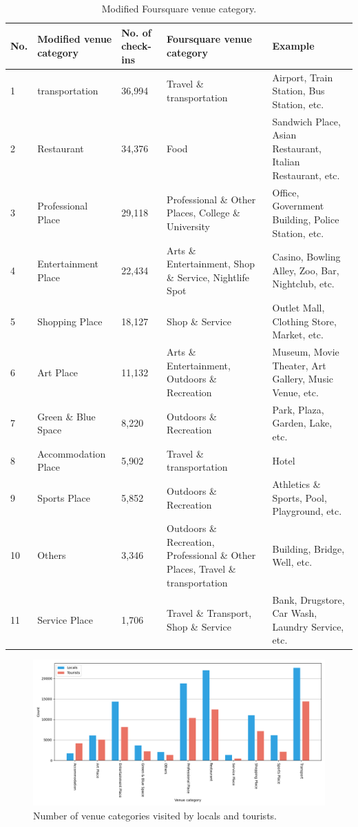 \documentclass{article}
\theoremstyle{definition}
\theoremstyle{remark}
\begin{document}
\begin{table}[h!]
\centering
\caption{\label{tab:modified_category}Modified Foursquare venue category.}
\begin{adjustbox}{max width=\textwidth, margin=0cm}
\begin{tabular}{lllp{6cm}p{5cm}} \hline
No. & Modified venue category & No. of check-ins & Foursquare venue category 
& Example \\ \hline
1 & transportation & 36,994 & Travel \& transportation & Airport, Train Station, Bus Station, etc. \\
2 & Restaurant & 34,376 & Food & Sandwich Place, Asian Restaurant, Italian Restaurant, etc. \\
3 & Professional Place & 29,118 & Professional \& Other Places, College \& University & Office, Government Building, Police Station, etc. \\
4 & Entertainment Place & 22,434 & Arts \& Entertainment, Shop \& Service, Nightlife Spot & Casino, Bowling Alley, Zoo, Bar, Nightclub, etc. \\
5 & Shopping Place & 18,127 & Shop \& Service & Outlet Mall, Clothing Store, Market, etc. \\
6 & Art Place & 11,132 & Arts \& Entertainment, Outdoors \& Recreation & Museum, Movie Theater, Art Gallery, Music Venue, etc. \\
7 & Green \& Blue Space & 8,220 & Outdoors \& Recreation & Park, Plaza, Garden, Lake, etc. \\
8 & Accommodation Place & 5,902 & Travel \& transportation & Hotel \\
9 & Sports Place & 5,852 & Outdoors \& Recreation & Athletics \& Sports, Pool, Playground, etc. \\
10 & Others & 3,346 & Outdoors \& Recreation, Professional \& Other Places, Travel \& transportation & Building, Bridge, Well, etc. \\
11 & Service Place & 1,706 & Travel \& Transport, Shop \& Service & Bank, Drugstore, Car Wash, Laundry Service, etc. \\ \hline
\end{tabular}
\end{adjustbox}
\end{table}


\begin{figure}[h!]
\centering
\includegraphics[width=1\textwidth]{figures/foursquare_category.png}
\caption{\label{fig:foursquare_category}Number of venue categories visited by locals and tourists.}
\end{figure}
\end{document}
